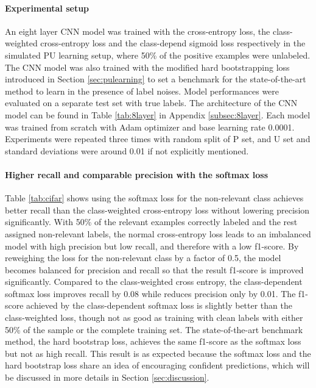 \paragraph{Experimental setup}
An eight layer CNN model was trained with the cross-entropy loss, the class-weighted cross-entropy loss and the class-depend sigmoid loss respectively in the simulated PU learning setup, where 50\% of the positive examples were unlabeled.
The CNN model was also trained with the modified hard bootstrapping loss introduced in Section \ref{sec:pulearning} to set a benchmark for the state-of-the-art method to learn in the presence of label noises.
Model performances were evaluated on a separate test set with true labels.
The architecture of the CNN model can be found in Table \ref{tab:8layer} in Appendix \ref{subsec:8layer}.
Each model was trained from scratch with Adam optimizer and base learning rate 0.0001.
Experiments were repeated three times with random split of P set, and U set and standard deviations were around 0.01 if not explicitly mentioned.


\paragraph{Higher recall and comparable precision with the softmax loss}

Table \ref{tab:cifar} shows using the softmax loss for the non-relevant class achieves better recall than the class-weighted cross-entropy loss without lowering precision significantly.
With 50\% of the relevant examples correctly labeled and the rest assigned non-relevant labels, the normal cross-entropy loss leads to an imbalanced model with high precision but low recall, and therefore with a low f1-score.
By reweighing the loss for the non-relevant class by a factor of 0.5, the model becomes balanced for precision and recall so that the result f1-score is improved significantly.
Compared to the class-weighted cross entropy, the class-dependent softmax loss improves recall by 0.08 while reduces precision only by 0.01.
The f1-score achieved by the class-dependent softmax loss is slightly better than the class-weighted loss, though not as good as training with clean labels with either 50\% of the sample or the complete training set.
The state-of-the-art benchmark method, the hard bootstrap loss, achieves the same f1-score as the softmax loss but not as high recall.
This result is as expected because the softmax loss and the hard bootstrap loss share an idea of encouraging confident predictions, which will be discussed in more details in Section \ref{sec:discussion}.

